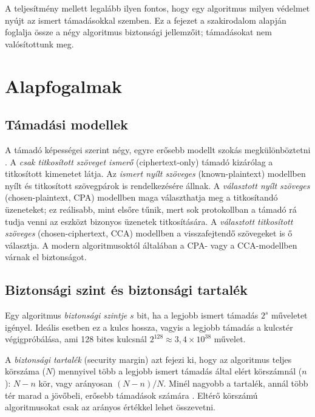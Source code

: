 \documentclass[a4paper,12pt]{report}
\theoremstyle{definition}
\theoremstyle{remark}
\begin{document}
A teljesítmény mellett legalább ilyen fontos, hogy egy algoritmus milyen védelmet nyújt az ismert támadásokkal szemben. Ez a fejezet a szakirodalom alapján foglalja össze a négy algoritmus biztonsági jellemzőit; támadásokat nem valósítottunk meg.

\section{Alapfogalmak}\label{sec:kriptoanalizis_alap}

\subsection{Támadási modellek}

A támadó képességei szerint négy, egyre erősebb modellt szokás megkülönböztetni \cite{Stallings2017}. A \emph{csak titkosított szöveget ismerő} (ciphertext-only) támadó kizárólag a titkosított kimenetet látja. Az \emph{ismert nyílt szöveges} (known-plaintext) modellben nyílt és titkosított szövegpárok is rendelkezésére állnak. A \emph{választott nyílt szöveges} (chosen-plaintext, CPA) modellben maga választhatja meg a titkosítandó üzeneteket; ez reálisabb, mint elsőre tűnik, mert sok protokollban a támadó rá tudja venni az eszközt bizonyos üzenetek titkosítására. A \emph{választott titkosított szöveges} (chosen-ciphertext, CCA) modellben a visszafejtendő szövegeket is ő választja. A modern algoritmusoktól általában a CPA- vagy a CCA-modellben várnak el biztonságot.

\subsection{Biztonsági szint és biztonsági tartalék}

Egy algoritmus \emph{biztonsági szintje} $s$ bit, ha a legjobb ismert támadás $2^s$ műveletet igényel. Ideális esetben ez a kulcs hossza, vagyis a legjobb támadás a kulcstér végigpróbálása, ami 128 bites kulcsnál $2^{128} \approx 3{,}4 \times 10^{38}$ művelet.

A \emph{biztonsági tartalék} (security margin) azt fejezi ki, hogy az algoritmus teljes körszáma ($N$) mennyivel több a legjobb ismert támadás által elért körszámnál ($n$): $N - n$ kör, vagy arányosan $(N-n)/N$. Minél nagyobb a tartalék, annál több tér marad a jövőbeli, erősebb támadások számára \cite{Biryukov2017}. Eltérő körszámú algoritmusokat csak az arányos értékkel lehet összevetni.
\end{document}
